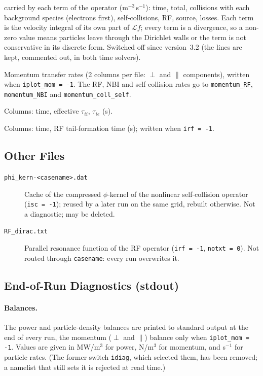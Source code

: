 \documentclass[11pt,a4paper]{article}
\begin{document}
\begin{description}
        carried by each term of the operator (m$^{-3}$\,s$^{-1}$): time, total,
        collisions with each background species (electrons first),
        self-collisions, RF, source, losses.  Each term is the velocity
        integral of its own part of $\mathcal{L}f$; every term is a divergence,
        so a non-zero value means particles leave through the Dirichlet walls
        or the term is not conservative in its discrete form.  Switched off
        since version~3.2 (the lines are kept, commented out, in both time
        solvers).
  \item[\texttt{momentum\_coll\_*\_vs\_time.txt}] Momentum transfer rates
        (2 columns per file: $\perp$ and $\parallel$ components), written when
        \texttt{iplot\_mom = -1}.  The RF, NBI and self-collision rates go
        to \texttt{momentum\_RF}, \texttt{momentum\_NBI} and
        \texttt{momentum\_coll\_self}.
  \item[\texttt{tau\_coll\_vs\_time.txt}] Columns: time, effective
        $\tau_{ii}$, $\tau_{ie}$ (s).
  \item[\texttt{tau\_rf\_vs\_time.txt}] Columns: time, RF tail-formation
        time (s); written when \texttt{irf = -1}.
\end{description}

\subsection{Other Files}

\begin{description}
  \item[\texttt{phi\_kern-<casename>.dat}] Cache of the compressed
        $\phi$-kernel of the nonlinear self-collision operator
        (\texttt{isc = -1}); reused by a later run on the same grid, rebuilt
        otherwise.  Not a diagnostic; may be deleted.
  \item[\texttt{RF\_dirac.txt}] Parallel resonance function of the RF
        operator (\texttt{irf = -1}, \texttt{notxt = 0}).  Not routed through
        \texttt{casename}: every run overwrites it.
\end{description}

\subsection{End-of-Run Diagnostics (stdout)}
\label{sec:endofrun}

\paragraph{Balances.}  The power and particle-density balances are printed to
standard output at the end of every run, the momentum ($\perp$ and
$\parallel$) balance only when \texttt{iplot\_mom = -1}.  Values are given in
MW/m$^3$ for power, N/m$^3$ for momentum, and s$^{-1}$ for particle rates.
(The former switch \texttt{idiag}, which selected them, has been removed; a
namelist that still sets it is rejected at read time.)
\end{document}
